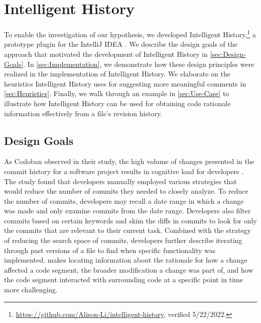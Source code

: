 \chapter{Intelligent History}
\label{ch:Intelligent-History}

To enable the investigation of our hypothesis, we developed Intelligent History,\footnote{\url{https://github.com/Alison-Li/intelligent-history}, verified 5/22/2022.} 
a prototype plugin for the IntelliJ IDEA .
We describe the design goals of the approach that motivated the development of Intelligent History in \autoref{sec:Design-Goals}. 
In \autoref{sec:Implementation}, we demonstrate how these design principles were realized in the implementation of Intelligent History. 
We elaborate on the heuristics Intelligent History uses for suggesting more meaningful comments in \autoref{sec:Heuristics}.
Finally, we walk through an example in \autoref{sec:Use-Case} to illustrate how Intelligent History can be used for obtaining code rationale information effectively from a file's revision history.

\section{Design Goals}
\label{sec:Design-Goals}

As Codoban \etal observed in their study, the high volume of changes presented in the commit history 
for a software project results in cognitive load for developers \cite{codoban_software_2015}.
The study found that developers manually employed various strategies that would 
reduce the number of commits they needed to closely analyze.
To reduce the number of commits, developers may recall a date range in which 
a change was made and only examine commits from the date range.
Developers also filter commits based on certain keywords and skim the diffs 
in commits to look for only the commits that are relevant to their current task.
Combined with the strategy of reducing the search space of commits, 
developers further describe iterating through past versions of a file to find when specific functionality was implemented.
makes locating information about the rationale for how a change affected a code segment, 
the broader modification a change was part of, 
and how the code segment interacted with surrounding code at a specific point in time more challenging.

